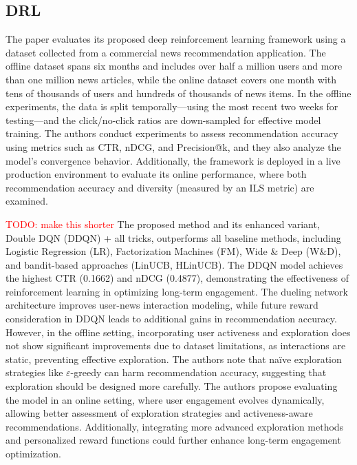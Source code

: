 \documentclass{ieeetj}
\begin{document}
\subsection{DRL\cite{zheng_drn_2018}}

The paper evaluates its proposed deep reinforcement learning framework using a dataset collected from a commercial news recommendation application. The offline dataset spans six months and includes over half a million users and more than one million news articles, while the online dataset covers one month with tens of thousands of users and hundreds of thousands of news items. In the offline experiments, the data is split temporally—using the most recent two weeks for testing—and the click/no-click ratios are down-sampled for effective model training. The authors conduct experiments to assess recommendation accuracy using metrics such as CTR, nDCG, and Precision@k, and they also analyze the model’s convergence behavior. Additionally, the framework is deployed in a live production environment to evaluate its online performance, where both recommendation accuracy and diversity (measured by an ILS metric) are examined.

\textcolor{red}{TODO: make this shorter}
The proposed method and its enhanced variant, Double DQN (DDQN) + all tricks, outperforms all baseline methods, including Logistic Regression (LR), Factorization Machines (FM), Wide \& Deep (W\&D), and bandit-based approaches (LinUCB, HLinUCB). The DDQN model achieves the highest CTR (0.1662) and nDCG (0.4877), demonstrating the effectiveness of reinforcement learning in optimizing long-term engagement. The dueling network architecture improves user-news interaction modeling, while future reward consideration in DDQN leads to additional gains in recommendation accuracy. However, in the offline setting, incorporating user activeness and exploration does not show significant improvements due to dataset limitations, as interactions are static, preventing effective exploration. The authors note that na\"{i}ve exploration strategies like $\varepsilon$-greedy can harm recommendation accuracy, suggesting that exploration should be designed more carefully. The authors propose evaluating the model in an online setting, where user engagement evolves dynamically, allowing better assessment of exploration strategies and activeness-aware recommendations. Additionally, integrating more advanced exploration methods and personalized reward functions could further enhance long-term engagement optimization.
\end{document}
